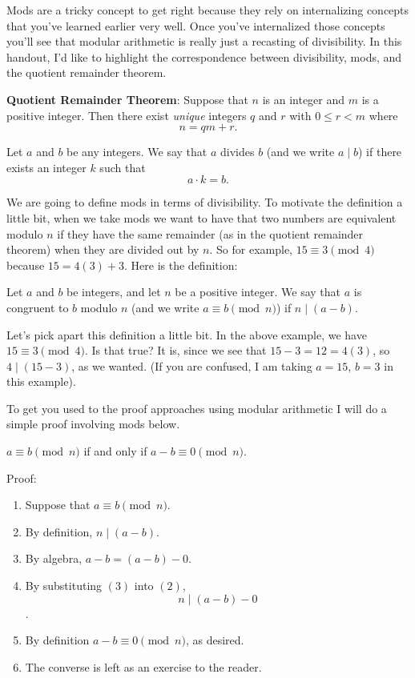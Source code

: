 Mods are a tricky concept to get right because they rely on internalizing concepts that you've learned earlier very well. Once you've internalized those concepts you'll see that modular arithmetic is really just a recasting of divisibility. In this handout, I'd like to highlight the correspondence between divisibility, mods, and the quotient remainder theorem.

\begin{tcolorbox}
\textbf{Quotient Remainder Theorem}: Suppose that $n$ is an integer and $m$ is a positive integer. Then there exist \textit{unique} integers $q$ and $r$ with $0 \leq r < m$ where
\[n = qm + r.\]
\end{tcolorbox}

\begin{tcolorbox}
Let $a$ and $b$ be any integers. We say that $a$ divides $b$ (and we write $a \mid b$) if there exists an integer $k$ such that 
\[a \cdot k = b.\]
\end{tcolorbox}

We are going to define mods in terms of divisibility. To motivate the definition a little bit, when we take mods we want to have that two numbers are equivalent modulo $n$ if they have the same remainder (as in the quotient remainder theorem) when they are divided out by $n$. So for example, $15 \equiv 3 \pmod{4}$ because $15 = 4(3) + 3$. Here is the definition:
\begin{tcolorbox}
Let $a$ and $b$ be integers, and let $n$ be a positive integer. We say that $a$ is congruent to $b$ modulo $n$ (and we write $a \equiv b \pmod{n}$) if $n \mid (a - b)$.
\end{tcolorbox}

Let's pick apart this definition a little bit. In the above example, we have $15 \equiv 3 \pmod{4}$. Is that true? It is, since we see that $15 - 3 = 12 = 4(3)$, so $4 \mid (15 - 3)$, as we wanted. (If you are confused, I am taking $a = 15$, $b = 3$ in this example).

To get you used to the proof approaches using modular arithmetic I will do a simple proof involving mods below.

\begin{tcolorbox}
$a \equiv b \pmod{n}$ if and only if $a - b \equiv 0 \pmod{n}$.
 \begin{tcolorbox}
  Proof:
  \begin{enumerate}
      \item Suppose that $a \equiv b \pmod{n}$.
      \item By definition, $n \mid (a - b)$.
      \item By algebra, $a - b = (a - b) - 0$.
      \item By substituting $(3)$ into $(2)$, 
      \[n \mid (a-b) - 0\].
      \item By definition $a - b \equiv 0 \pmod{n}$, as desired.
      
      \item The converse is left as an exercise to the reader.
  \end{enumerate}
 \end{tcolorbox}
\end{tcolorbox}

